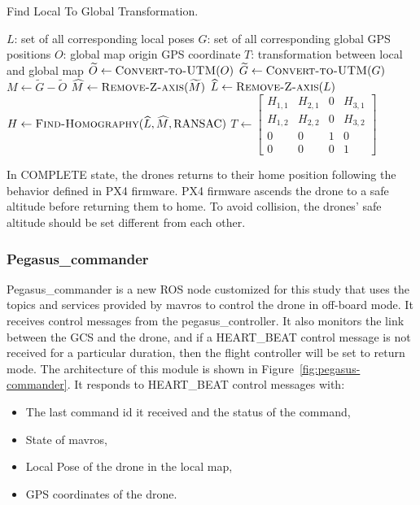\renewcommand{\algorithmicrequire}{\textbf{Input:}}
\renewcommand{\algorithmicensure}{\textbf{Output:}}
\renewcommand{\algorithmicforall}{\textbf{for each}}
\begin{algorithm}
	\caption{Find Local To Global Transformation.}
	\label{alg:find-transforms}
	\begin{algorithmic}
		\REQUIRE $L$: set of all corresponding local poses
		\REQUIRE $G$: set of all corresponding global GPS positions
		\REQUIRE $O$: global map origin GPS coordinate
		\ENSURE $T$: transformation between local and global map
		\STATE $\widetilde{O} \gets \textsc{Convert-to-UTM}(O)$
		\STATE $\widetilde{G} \gets \textsc{Convert-to-UTM}(G)$
		\STATE $M \gets \widetilde{G} - \widetilde{O}$
		\STATE $\widehat{M} \gets \textsc{Remove-Z-axis}(\widetilde{M})$
		\STATE $\widehat{L} \gets \textsc{Remove-Z-axis}(L)$
		\STATE $H \gets \textsc{Find-Homography}(\widehat{L}, \widehat{M}, \text{RANSAC})$
		\STATE $T \gets \begin{bmatrix}
		H_{1,1} & H_{2,1} & 0 & H_{3,1} \\
		H_{1,2} & H_{2,2} & 0 & H_{3,2} \\
		0 & 0 & 1 & 0 \\
		0 & 0 & 0 & 1
		\end{bmatrix}$
	\end{algorithmic}
\end{algorithm}

In COMPLETE state, the drones returns to their home position following the behavior defined in PX4 firmware. PX4 firmware ascends the drone to a safe altitude before returning them to home. To avoid collision, the drones' safe altitude should be set different from each other.

\subsubsection{Pegasus\_commander} \label{section:pegasus-commander}

Pegasus\_commander is a new ROS node customized for this study that uses the topics and services provided by mavros to control the drone in off-board mode. It receives control messages from the pegasus\_controller. It also monitors the link between the GCS and the drone, and if a HEART\_BEAT control message is not received for a particular duration, then the flight controller will be set to return mode. The architecture of this module is shown in Figure~\ref{fig:pegasus-commander}.
It responds to HEART\_BEAT control messages with:
\begin{itemize}
	\item The last command id it received and the status of the command,
	\item State of mavros,
	\item Local Pose of the drone in the local map,
	\item GPS coordinates of the drone.
\end{itemize}

